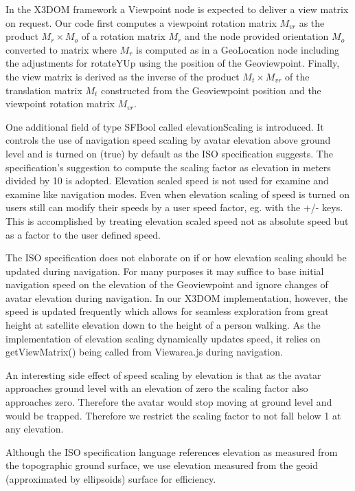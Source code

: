 \documentclass{acmsiggraph}                     %
\begin{document}
In the X3DOM framework a Viewpoint node is expected to deliver a view matrix on request. Our code
first computes a viewpoint rotation matrix $M_{vr}$ as the product $M_r \times M_o$ of a rotation
matrix $M_r$ and the node provided orientation $M_o$ converted to matrix where $M_r$ is computed as
in a GeoLocation node including the adjustments for rotateYUp using the position of the
Geoviewpoint. Finally, the view matrix is derived as the inverse of the product $M_t \times M_{vr}$
of the translation matrix $M_t$ constructed from the Geoviewpoint position and the viewpoint
rotation matrix $M_{vr}$.

One additional field of type SFBool called elevationScaling is introduced. It controls the use of
navigation speed scaling by avatar elevation above ground level and is turned on (true) by default
as the ISO specification suggests. The specification's suggestion to compute the scaling factor as
elevation in meters divided by 10 is adopted. Elevation scaled speed is not used for examine and
examine like navigation modes. Even when elevation scaling of speed is turned on users still can
modify their speeds by a user speed factor, eg. with the +/- keys. This is accomplished by treating
elevation scaled speed not as absolute speed but as a factor to the user defined speed. 

The ISO specification does not elaborate on if or how elevation scaling should be updated during
navigation. For many purposes it may suffice to base initial navigation speed on the elevation of
the Geoviewpoint and ignore changes of avatar elevation during navigation. In our X3DOM
implementation, however, the speed is updated frequently which allows for seamless exploration from
great height at satellite elevation down to the height of a person walking. As the implementation of
elevation scaling dynamically updates speed, it relies on getViewMatrix() being called from
Viewarea.js during navigation.

An interesting side effect of speed scaling by elevation is that as the avatar approaches ground
level with an elevation of zero the scaling factor also approaches zero. Therefore the avatar would
stop moving at ground level and would be trapped. Therefore we restrict  the scaling factor to not
fall below 1 at any elevation.

Although the ISO specification language references elevation as measured from the topographic ground
surface, we use elevation measured from the geoid (approximated by ellipsoids) surface for
efficiency.
\end{document}
